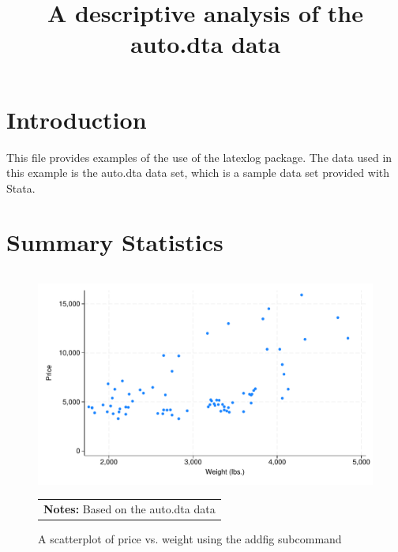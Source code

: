 \documentclass{article}
\begin{document}
\title{A descriptive analysis of the auto.dta data}
\maketitle
\section{Introduction}
This file provides examples of the use of the latexlog package.
The data used in this example is the auto.dta data set, which is a sample data set provided with Stata.
\section{Summary Statistics}
\begin{figure}[h] 
\centering 
\begin{tabular}{p{6in}}
\caption{A scatterplot of price vs. weight using the addfig subcommand} 
\end{tabular}
\includegraphics[width = .8\textwidth]{scatter_price.pdf} \\ 
\begin{tabular}{p{6in}}  
\footnotesize \vspace{2pt} 
\centering \textbf{Notes:} Based on the auto.dta data 
\end{tabular} 
\end{figure} 
\end{document}
